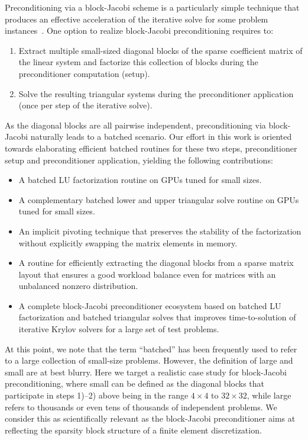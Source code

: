 Preconditioning via a block-Jacobi scheme is a particularly simple technique that produces an effective acceleration
of the iterative solve for some problem instances~\cite{saad}.
One option to realize block-Jacobi preconditioning requires to:
\begin{enumerate}
\item Extract multiple small-sized diagonal blocks of the sparse coefficient matrix of the linear system and
      factorize this collection of blocks during the preconditioner computation (setup).
\item Solve the resulting triangular systems during the preconditioner application (once per step of the iterative solve).
\end{enumerate}
As the diagonal blocks are all pairwise independent, preconditioning via block-Jacobi naturally leads to a batched scenario.
Our effort in this work is oriented towards elaborating efficient batched routines for these two steps, 
preconditioner setup and preconditioner application, yielding the following contributions:
\begin{itemize}
\item A batched LU factorization routine on GPUs tuned for small sizes.
\item A complementary batched lower and upper triangular solve routine on GPUs
    tuned for small sizes.
\item An implicit pivoting technique that preserves the stability of the factorization 
      without explicitly swapping the matrix elements in memory.
\item A routine for efficiently extracting the diagonal blocks from a sparse matrix layout
that ensures a good workload balance even for matrices with an unbalanced nonzero distribution.
\item A complete block-Jacobi preconditioner ecosystem based on batched LU factorization and batched triangular solves
that improves time-to-solution of iterative Krylov solvers for a large set of test problems.
\end{itemize}
At this point, we note that
the term ``batched'' has been frequently used 
to refer to a large collection of small-size problems. 
However, the definition of large and small are at best blurry. 
Here we target a realistic case study for block-Jacobi preconditioning, where 
small can be defined as the diagonal blocks that participate in steps 1)--2) above being in the range $4\times4$ to $32\times32$,
while large refers to thousands or even tens of thousands of independent problems.
We consider this as scientifically relevant as the block-Jacobi preconditioner %
aims at reflecting the sparsity block structure of a finite element discretization.

